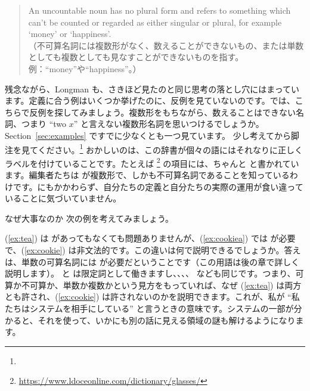 \begin{quote}
    An uncountable noun has no plural form and refers to something which can't be counted or regarded as either singular or plural, for example `money' or `happiness'.\\
    （不可算名詞には複数形がなく、数えることができないもの、または単数としても複数としても見なすことができないものを指す。例：\enquote{money}や\enquote{happiness}。）
\end{quote}
残念ながら、Longman も、さきほど見たのと同じ思考の落とし穴にはまっています。定義に合う例はいくつか挙げたのに、反例を見ていないのです。では、こちらで反例を探してみましょう。複数形をもちながら、数えることはできない名詞、つまり \enquote{two $x$} と言えない複数形名詞を思いつけるでしょうか。Section~\ref{sec:examples} ですでに少なくとも一つ見ています。 少し考えてから脚注を見てください。\footnote{
} おかしいのは、この辞書が個々の語にはそれなりに正しくラベルを付けていることです。たとえば \footnote{\url{https://www.ldoceonline.com/dictionary/glasses/}} の項目には、ちゃんと  と書かれています。編集者たちは  が複数形で、しかも不可算名詞であることを知っているわけです。にもかかわらず、自分たちの定義と自分たちの実際の運用が食い違っていることに気づいていません。


\begin{tblsframed}{なぜ大事なのか}
    次の例を考えてみましょう。

    \ea
        \label{ex:tea}
        \label{ex:cookiea}
        \label{ex:cookie}
        \z\label{ex:blank}
    \z
    (\ref{ex:tea}) は  があってもなくても問題ありませんが、(\ref{ex:cookiea}) では  が必要で、(\ref{ex:cookie}) は非文法的です。この違いは何で説明できるでしょうか。答えは、単数の可算名詞には  が必要だということです（この用語は後の章で詳しく説明します）。 と  は限定詞として働きますし、、、、 なども同じです。つまり、可算か不可算か、単数か複数かという見方をもっていれば、なぜ (\ref{ex:tea}) は両方とも許され、(\ref{ex:cookie}) は許されないのかを説明できます。これが、私が \enquote{私たちはシステムを相手にしている} と言うときの意味です。システムの一部が分かると、それを使って、いかにも別の話に見える領域の謎も解けるようになります。
\end{tblsframed}

